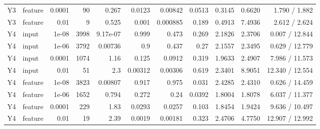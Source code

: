 \begin{landscape}
{\begin{longtable}{llrrrrrrrrr}
Y3 & feature & 0.0001 & 90 & 0.267 & 0.0123 & 0.00842 & 0.0513 & 0.3145 & 0.6620 & 1.790 / 1.882 \\
Y3 & feature & 0.01 & 9 & 0.525 & 0.001 & 0.000885 & 0.189 & 0.4913 & 7.4936 & 2.612 / 2.624 \\
Y4 & input & 1e-08 & 3998 & 9.17e-07 & 0.999 & 0.473 & 0.269 & 2.1826 & 2.3706 & 0.007 / 12.844 \\
Y4 & input & 1e-06 & 3792 & 0.00736 & 0.9 & 0.437 & 0.27 & 2.1557 & 2.3495 & 0.629 / 12.779 \\
Y4 & input & 0.0001 & 1074 & 1.16 & 0.125 & 0.0912 & 0.319 & 1.9633 & 2.4907 & 7.986 / 11.573 \\
Y4 & input & 0.01 & 51 & 2.3 & 0.00312 & 0.00306 & 0.619 & 2.3401 & 8.9051 & 12.340 / 12.554 \\
Y4 & feature & 1e-08 & 3823 & 0.00807 & 0.917 & 0.975 & 0.031 & 2.4285 & 2.4310 & 0.626 / 14.459 \\
Y4 & feature & 1e-06 & 1652 & 0.794 & 0.272 & 0.24 & 0.0392 & 1.8004 & 1.8078 & 6.037 / 11.377 \\
Y4 & feature & 0.0001 & 229 & 1.83 & 0.0293 & 0.0257 & 0.103 & 1.8454 & 1.9424 & 9.636 / 10.497 \\
Y4 & feature & 0.01 & 19 & 2.39 & 0.0019 & 0.00181 & 0.323 & 2.4706 & 4.7750 & 12.907 / 12.992 \\
\end{longtable}}
\end{landscape}
